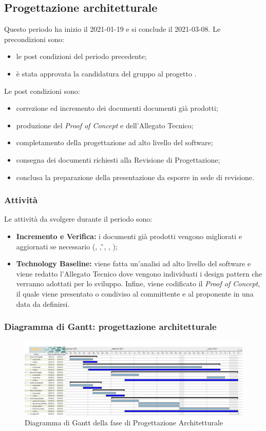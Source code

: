 \newpage
\subsection{Progettazione architetturale}
Questo periodo ha inizio il 2021-01-19 e si conclude il 2021-03-08.
Le precondizioni sono:
\begin{itemize}
	\item le post condizioni del periodo precedente;
	\item è stata approvata la candidatura del gruppo al progetto \NomeProgetto.
\end{itemize}
Le post condizioni sono:
\begin{itemize}
	\item correzione ed incremento dei documenti documenti già prodotti;
	\item produzione del \textit{Proof of Concept} e dell'Allegato Tecnico;
	\item completamento della progettazione ad alto livello del software;
	\item consegna dei documenti richiesti alla Revisione di Progettazione; 	
	\item conclusa la preparazione della presentazione da esporre in sede di revisione.
\end{itemize}
\subsubsection{Attività}
Le attività da svolgere durante il periodo sono:
\begin{itemize}
	\item \textbf{Incremento e Verifica:} i documenti già prodotti vengono migliorati e aggiornati se necessario (\NdP{}, \PdP{}, \G{}, \PdQ{}, \AdR{});
	\item \textbf{Technology Baseline:} viene fatta un'analisi ad alto livello del software e viene redatto l'Allegato Tecnico dove vengono individuati i design pattern che verranno adottati per lo sviluppo. Infine, viene codificato il \textit{Proof of Concept}, il quale viene presentato o condiviso al committente e al proponente in una data da definirsi.
\end{itemize}
\subsubsection{Diagramma di Gantt: progettazione architetturale}
\begin{figure}[H]
    \centering
    \includegraphics[scale = 0.25]{components/img/progettazione_architetturale.jpg}
    \caption{Diagramma di Gantt della fase di Progettazione Architetturale}
    \label{fig:Diagramma di Gantt, fase di Progettazione Architetturale}
\end{figure}

